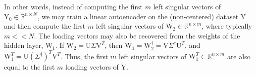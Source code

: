 In other words, instead of computing the first $m$ left singular vectors of $\text{Y}_0 \in \mathbb{R}^{n \times N}$, we may train a linear autoencoder on the (non-centered) dataset $\text{Y}$ and then compute the first $m$ left singular vectors of $\text{W}_2 \in \mathbb{R}^{n \times m}$, where typically $m << N$. The loading vectors may also be recovered from the weights of the hidden layer, $\text{W}_1$. If $\text{W}_2 = \text{U} \Sigma \text{V}^T$, then $\text{W}_1 = \text{W}_2^{\dagger} = \text{V} \Sigma^{\dagger} \text{U}^T$, and $\text{W}_1^T = \text{U} \left( \Sigma^{\dagger} \right)^T \text{V}^T$. Thus, the first $m$ left singular vectors of $\text{W}_1^T \in \mathbb{R}^{n \times m}$ are also equal to the first $m$ loading vectors of $\text{Y}$.


